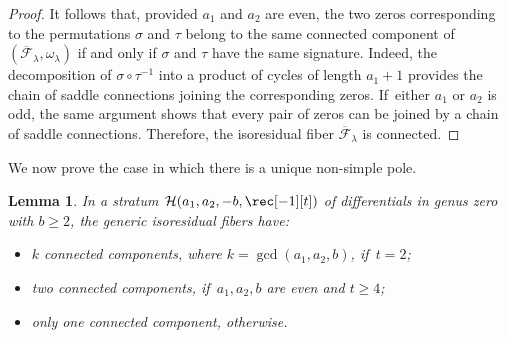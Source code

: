 \documentclass[JEP,XML,SOM,Unicode,NoFloatCountersInSection,published]{cedram}
\newtheorem{lem}[thm]{Lemma}
\theoremstyle{definition}
\begin{document}
\begin{proof}
It follows that, provided $a_{1}$ and $a_{2}$ are even, the two zeros corresponding to the permutations $\sigma$ and $\tau$ belong to the same connected component of $(\overline{\mathcal{F}}_{\lambda}, \omega_\lambda)$ if and only if $\sigma$ and $\tau$ have the same signature. Indeed, the decomposition of $\sigma \circ \tau^{-1}$ into a product of cycles of length $a_{1}+1$ provides the chain of saddle connections joining the corresponding zeros. If~either $a_{1}$ or $a_{2}$ is odd, the same argument shows that every pair of zeros can be joined by a chain of saddle connections. Therefore, the isoresidual fiber $\overline{\mathcal{F}}_{\lambda}$ is connected.
\end{proof}

We now prove the case in which there is a unique non-simple pole.

\begin{lem}\label{lem:MAIN51big}
In a stratum $\mathcal{H}(a_{1},a_{2},-b,\rec[-1][t])$ of differentials in genus zero with $b\geq2$, the generic isoresidual fibers have:
\begin{itemize}
\item $k$ connected components, where $k=\gcd(a_{1},a_{2},b)$, if~$t=2$;
\item two connected components, if~$a_{1},a_{2},b$ are even and $t \geq 4$;
\item only one connected component, otherwise.
\end{itemize}
\end{lem}
\end{document}

